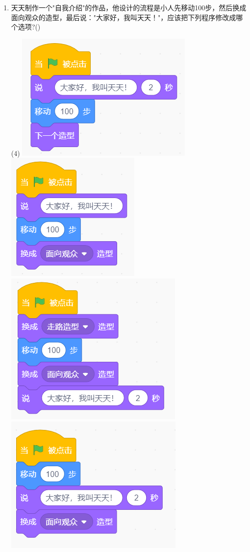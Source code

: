 \documentclass[10pt, a4paper]{article}
\begin{document}
\begin{enumerate}
        \item 天天制作一个"自我介绍"的作品，他设计的流程是小人先移动100步，然后换成面向观众的造型，最后说："大家好，我叫天天！"，应该把下列程序修改成哪个选项?(\qquad)
        \begin{tasks}(4)
            \task \includegraphics[width=.15\textwidth]{20a.png}
            \task \includegraphics[width=.12\textwidth]{20b.png}
            \task \includegraphics[width=.15\textwidth]{20c.png}
            \task \includegraphics[width=.15\textwidth]{20d.png}
        \end{tasks}


\end{enumerate}
\end{document}
